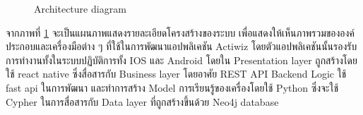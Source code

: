 \documentclass[14pt,oneside,openright,a4paper]{cpe-thai-project}
\begin{document}
  \begin{figure}[!h]\centering
    \setlength{\fboxrule}{0.5mm} %
    \setlength{\fboxsep}{0.5cm}
    \caption{Architecture diagram}\label{fig:ArchDia}
    \end{figure}

  จากภาพที่ \ref{fig:ArchDia} จะเป็นแผนภาพแสดงรายละเอียดโครงสร้างของระบบ เพื่อแสดงให้เห็นภาพรวมขององค์ประกอบและเครื่องมือต่าง ๆ ที่ใช้ในการพัฒนาแอปพลิเคชัน Actiwiz โดยตัวแอปพลิเคชันนั้นรองรับการทำงานทั้งในระบบปฏิบัติการทั้ง IOS และ Android โดยใน Presentation layer ถูกสร้างโดยใช้ react native ซึ่งสื่อสารกับ Business layer โดยอาศัย REST API Backend Logic ใช้ fast api ในการพัฒนา และทำการสร้าง Model การเรียนรู้ของเครื่องโดยใช้ Python ซึ่งจะใช้ Cypher ในการสื่อสารกับ Data layer ที่ถูกสร้างขึ้นด้วย Neo4j database
\newpage
\end{document}

